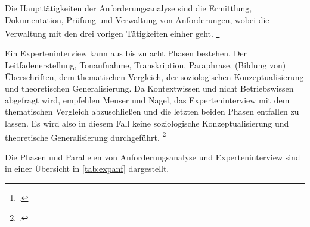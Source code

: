 Die Haupttätigkeiten der Anforderungsanalyse sind die Ermittlung, Dokumentation, Prüfung und Verwaltung von Anforderungen, wobei die Verwaltung mit den drei vorigen Tätigkeiten einher geht. \footcite[Vgl.][4\psq]{Pohl_2015_Requirements}

Ein Experteninterview kann aus bis zu acht Phasen bestehen. Der Leitfadenerstellung, Tonaufnahme, Transkription, Paraphrase, (Bildung von) Überschriften, dem thematischen Vergleich, der soziologischen Konzeptualisierung und theoretischen Generalisierung.
Da Kontextwissen und nicht Betriebswissen abgefragt wird, empfehlen Meuser und Nagel, das Experteninterview mit dem thematischen Vergleich abzuschließen und die letzten beiden Phasen entfallen zu lassen. Es wird also in diesem Fall keine soziologische Konzeptualisierung und theoretische Generalisierung durchgeführt. \footcite[Vgl.][466\psq]{Meuser_1991_Interview}

Die Phasen und Parallelen von Anforderungsanalyse und Experteninterview sind in einer Übersicht in \autoref{tab:expanf} dargestellt.


